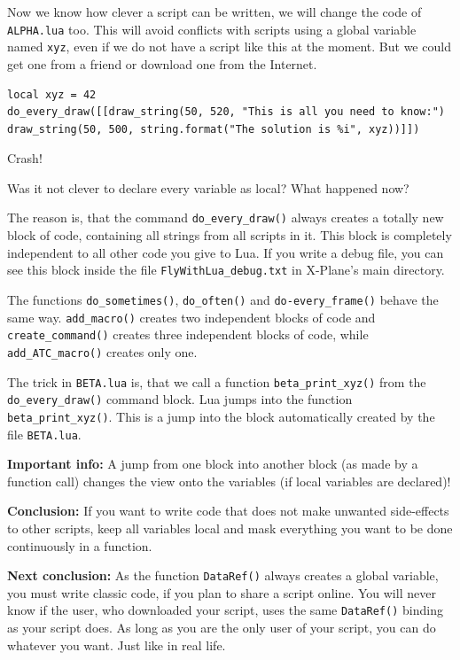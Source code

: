 \documentclass[11pt,parskip=half,a4paper]{scrartcl}
\begin{document}
Now we know how clever a script can be written, we will change the code of \verb|ALPHA.lua| too. This will avoid conflicts with scripts using a global variable named \verb|xyz|, even if we do not have a script like this at the moment. But we could get one from a friend or download one from the Internet.

\begin{lstlisting}
local xyz = 42
do_every_draw([[draw_string(50, 520, "This is all you need to know:")
draw_string(50, 500, string.format("The solution is %i", xyz))]])
\end{lstlisting}

Crash!

Was it not clever to declare every variable as local? What happened now?

The reason is, that the command \verb|do_every_draw()| always creates a totally new block of code, containing all strings from all scripts in it. This block is completely independent to all other code you give to Lua. If you write a debug file, you can see this block inside the file \verb|FlyWithLua_debug.txt| in X-Plane's main directory.

The functions \verb|do_sometimes()|, \verb|do_often()| and \verb|do-every_frame()| behave the same way. \verb|add_macro()| creates two independent blocks of code and \verb|create_command()| creates three independent blocks of code, while \verb|add_ATC_macro()| creates only one.

The trick in \verb|BETA.lua| is, that we call a function \verb|beta_print_xyz()| from the \verb|do_every_draw()| command block. Lua jumps into the function \verb|beta_print_xyz()|. This is a jump into the block automatically created by the file \verb|BETA.lua|.

\textbf{Important info:} A jump from one block into another block (as made by a function call) changes the view onto the variables (if local variables are declared)!

\textbf{Conclusion:} If you want to write code that does not make unwanted side-effects to other scripts, keep all variables local and mask everything you want to be done continuously in a function.

\textbf{Next conclusion:} As the function \verb|DataRef()| always creates a global variable, you must write classic code, if you plan to share a script online. You will never know if the user, who downloaded your script, uses the same \verb|DataRef()| binding as your script does. As long as you are the only user of your script, you can do whatever you want. Just like in real life.
\end{document}
